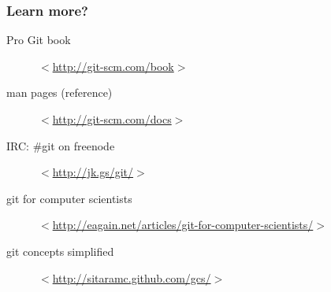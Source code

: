 \documentclass[%
        hyperref={%
                pdfauthor={Zakariyya Mughal},%
                pdfpagemode={None},pdfpagelayout={SinglePage}}%
        xcolor={x11names},%
]{beamer}
\begin{document}
\begin{frame}
\frametitle{Learn more?}
\begin{description}
\item[Pro Git book]
	$<$\href{http://git-scm.com/book}{http://git-scm.com/book}$>$
\item[man pages (reference)]
	$<$\href{http://git-scm.com/docs}{http://git-scm.com/docs}$>$
\item[IRC: \#git on freenode]
	$<$\href{http://jk.gs/git/}{http://jk.gs/git/}$>$
\item[git for computer scientists]
	$<$\href{http://eagain.net/articles/git-for-computer-scientists/}{http://eagain.net/articles/git-for-computer-scientists/}$>$
\item[git concepts simplified]
	$<$\href{http://sitaramc.github.com/gcs/}{http://sitaramc.github.com/gcs/}$>$
\end{description}
\end{frame}
\end{document}
